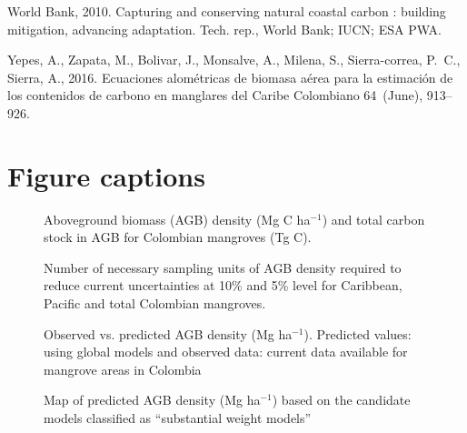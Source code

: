 \documentclass[review, authoryear]{elsarticle}   	%
\begin{document}
\begin{thebibliography}{51}
{World Bank}, 2010. {Capturing and conserving natural coastal carbon : building
  mitigation, advancing adaptation}. Tech. rep., World Bank; IUCN; ESA PWA.

Yepes, A., Zapata, M., Bolivar, J., Monsalve, A., Milena, S., Sierra-correa,
  P.~C., Sierra, A., 2016. {Ecuaciones alom{\'{e}}tricas de biomasa a{\'{e}}rea
  para la estimaci{\'{o}}n de los contenidos de carbono en manglares del Caribe
  Colombiano} 64~(June), 913--926.

\end{thebibliography}

\clearpage

\section*{Figure captions}

\newpage

\begin{figure}
\caption{Aboveground biomass (AGB) density (Mg C ha$^{-1}$) and total carbon stock in AGB for Colombian mangroves (Tg C).} \label{fig:Csotck}
\end{figure}

\begin{figure} 
\caption{Number of necessary sampling units of AGB density required to reduce current uncertainties at 10\% and 5\% level for Caribbean, Pacific and total Colombian mangroves.} \label{fig:samplingEffort}
\end{figure}

\begin{figure} 
\caption{ Observed vs. predicted AGB density (Mg ha$^{-1}$). Predicted values: using global models \citep{Twilley1992, CONL:CONL12060} and observed data: current data available for mangrove areas in Colombia} \label{fig:globalModels}
\end{figure}

\begin{figure} 
\caption{Map of predicted AGB density (Mg ha$^{-1}$) based on the candidate models classified as ``substantial weight models''} \label{fig:Predicted AGB density map}
\end{figure}
\end{document}
